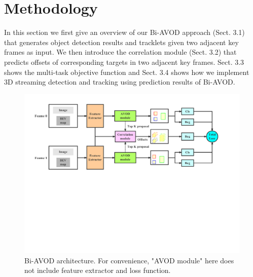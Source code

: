 \documentclass{bmvc2k}
\begin{document}
\section{Methodology}
\label{sec:method}
In this section we first give an overview of our Bi-AVOD approach (Sect. 3.1) that generates object detection results and tracklets given two adjacent key frames as input. We then introduce the correlation module (Sect. 3.2) that predicts offsets of corresponding targets in two adjacent key frames. Sect. 3.3 shows the multi-task objective function and Sect. 3.4 shows how we implement 3D streaming detection and tracking using prediction results of Bi-AVOD.

\begin{figure}
	\rule{0pt}{1ex}
	\setlength{\abovecaptionskip}{-1.5cm}
	\begin{center}
		\includegraphics[trim={0cm, 10cm, 3cm, 1cm}, clip, width=\textwidth]{images/Bi-AVOD.pdf}
	\end{center}
	\caption{Bi-AVOD architecture. For convenience, "AVOD module" here does not include feature extractor and loss function.}
	\label{fig:bi-avod}
	\vspace{-0.5cm}
\end{figure}
\end{document}
